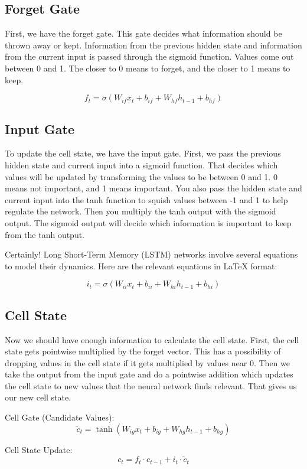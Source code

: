 \documentclass{report}
\begin{document}
\subsection{Forget Gate}
First, we have the forget gate. This gate decides what information should be thrown away or kept. Information from the previous hidden state and information from the current input is passed through the sigmoid function. Values come out between 0 and 1. The closer to 0 means to forget, and the closer to 1 means to keep.

   \[
   f_t = \sigma(W_{if} x_t + b_{if} + W_{hf} h_{t-1} + b_{hf})
   \]

\subsection{Input Gate}
To update the cell state, we have the input gate. First, we pass the previous hidden state and current input into a sigmoid function. That decides which values will be updated by transforming the values to be between 0 and 1. 0 means not important, and 1 means important. You also pass the hidden state and current input into the tanh function to squish values between -1 and 1 to help regulate the network. Then you multiply the tanh output with the sigmoid output. The sigmoid output will decide which information is important to keep from the tanh output.

Certainly! Long Short-Term Memory (LSTM) networks involve several equations to model their dynamics. Here are the relevant equations in LaTeX format:

   \[
   i_t = \sigma(W_{ii} x_t + b_{ii} + W_{hi} h_{t-1} + b_{hi})
   \]

\subsection{Cell State}
Now we should have enough information to calculate the cell state. First, the cell state gets pointwise multiplied by the forget vector. This has a possibility of dropping values in the cell state if it gets multiplied by values near 0. Then we take the output from the input gate and do a pointwise addition which updates the cell state to new values that the neural network finds relevant. That gives us our new cell state.

Cell Gate (Candidate Values):
   \[
   \tilde{c}_t = \tanh(W_{ig} x_t + b_{ig} + W_{hg} h_{t-1} + b_{hg})
   \]

Cell State Update:
   \[
   c_t = f_t \cdot c_{t-1} + i_t \cdot \tilde{c}_t
   \]
\end{document}
